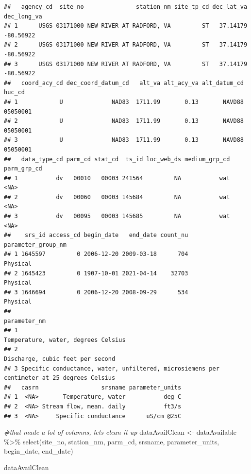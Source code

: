 \documentclass[
]{book}
\newenvironment{Shaded}{\begin{snugshade}}{\end{snugshade}}
\newcommand{\CommentTok}[1]{\textcolor[rgb]{0.56,0.35,0.01}{\textit{#1}}}
\newcommand{\FunctionTok}[1]{\textcolor[rgb]{0.00,0.00,0.00}{#1}}
\newcommand{\NormalTok}[1]{#1}
\newcommand{\OtherTok}[1]{\textcolor[rgb]{0.56,0.35,0.01}{#1}}
\newcommand{\SpecialCharTok}[1]{\textcolor[rgb]{0.00,0.00,0.00}{#1}}
\begin{document}
\begin{verbatim}
##   agency_cd  site_no               station_nm site_tp_cd dec_lat_va dec_long_va
## 1      USGS 03171000 NEW RIVER AT RADFORD, VA         ST   37.14179   -80.56922
## 2      USGS 03171000 NEW RIVER AT RADFORD, VA         ST   37.14179   -80.56922
## 3      USGS 03171000 NEW RIVER AT RADFORD, VA         ST   37.14179   -80.56922
##   coord_acy_cd dec_coord_datum_cd   alt_va alt_acy_va alt_datum_cd   huc_cd
## 1            U              NAD83  1711.99       0.13       NAVD88 05050001
## 2            U              NAD83  1711.99       0.13       NAVD88 05050001
## 3            U              NAD83  1711.99       0.13       NAVD88 05050001
##   data_type_cd parm_cd stat_cd  ts_id loc_web_ds medium_grp_cd parm_grp_cd
## 1           dv   00010   00003 241564         NA           wat        <NA>
## 2           dv   00060   00003 145684         NA           wat        <NA>
## 3           dv   00095   00003 145685         NA           wat        <NA>
##    srs_id access_cd begin_date   end_date count_nu parameter_group_nm
## 1 1645597         0 2006-12-20 2009-03-18      704           Physical
## 2 1645423         0 1907-10-01 2021-04-14    32703           Physical
## 3 1646694         0 2006-12-20 2008-09-29      534           Physical
##                                                                                 parameter_nm
## 1                                                        Temperature, water, degrees Celsius
## 2                                                           Discharge, cubic feet per second
## 3 Specific conductance, water, unfiltered, microsiemens per centimeter at 25 degrees Celsius
##   casrn                  srsname parameter_units
## 1  <NA>       Temperature, water           deg C
## 2  <NA> Stream flow, mean. daily           ft3/s
## 3  <NA>     Specific conductance      uS/cm @25C
\end{verbatim}

\begin{Shaded}
\begin{Highlighting}[]
\CommentTok{\#that made a lot of columns, let\textquotesingle{}s clean it up}
\NormalTok{dataAvailClean }\OtherTok{\textless{}{-}}\NormalTok{ dataAvailable }\SpecialCharTok{\%\textgreater{}\%} \FunctionTok{select}\NormalTok{(site\_no, }
\NormalTok{                                           station\_nm,}
\NormalTok{                                           parm\_cd, }
\NormalTok{                                           srsname, }
\NormalTok{                                           parameter\_units,}
\NormalTok{                                           begin\_date, }
\NormalTok{                                           end\_date)}

\NormalTok{dataAvailClean}
\end{Highlighting}
\end{Shaded}
\end{document}
